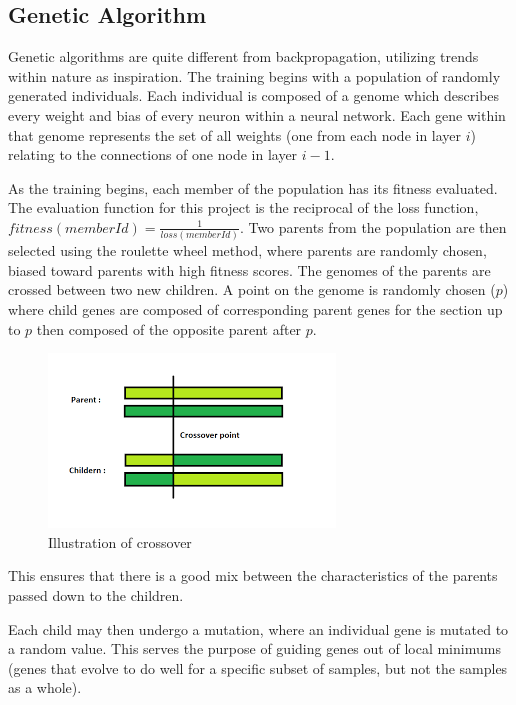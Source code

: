 \documentclass[12pt]{article}
\begin{document}
    \subsection{Genetic Algorithm}
        Genetic algorithms are quite different from backpropagation, utilizing trends within nature as inspiration.
        The training begins with a population of randomly generated individuals.  Each individual is composed of a genome which 
        describes every weight and bias of every neuron within a neural network.  Each gene within that genome represents
        the set of all weights (one from each node in layer \(i\)) relating to the connections of one node in layer \(i-1\).

        As the training begins, each member of the population has its fitness evaluated.  The evaluation function for this project
        is the reciprocal of the loss function, \(fitness(memberId) = \frac{1}{loss(memberId)}\).  Two parents from the population
        are then selected using the roulette wheel method, where parents are randomly chosen, biased toward parents with high fitness scores.
        The genomes of the parents are crossed between two new children.  A point on the genome is randomly chosen (\(p\)) where
        child genes are composed of corresponding parent genes for the section up to \(p\) then composed of the opposite parent after \(p\).
        \pagebreak
        \begin{figure}[h]
            \includegraphics[scale=.5]{crossover.png}
            \centering
            \caption{Illustration of crossover \cite{crossoverDiagram}}
        \end{figure}

        This ensures that there is a good mix between the characteristics of the parents passed down to the children.

        Each child may then undergo a mutation, where an individual gene is mutated to a random value.  This serves the
        purpose of guiding genes out of local minimums (genes that evolve to do well for a specific subset of samples, but
        not the samples as a whole).
        
\end{document}
